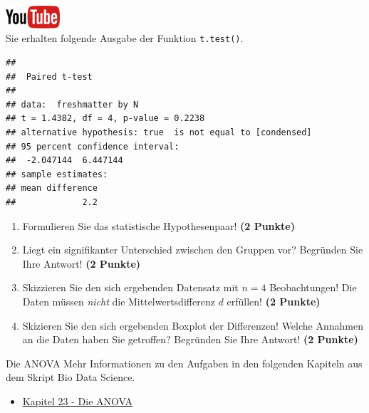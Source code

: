 \documentclass[a4paper, 9pt]{scrartcl}\usepackage[]{graphicx}\usepackage[]{xcolor}
\makeatletter
\newenvironment{kframe}{%
 \def\at@end@of@kframe{}%
 \ifinner\ifhmode%
  \def\at@end@of@kframe{\end{minipage}}%
  \begin{minipage}{\columnwidth}%
 \fi\fi%
 \def\FrameCommand##1{\hskip\@totalleftmargin \hskip-\fboxsep
 \colorbox{shadecolor}{##1}\hskip-\fboxsep
     \hskip-\linewidth \hskip-\@totalleftmargin \hskip\columnwidth}%
 \MakeFramed {\advance\hsize-\width
   \@totalleftmargin\z@ \linewidth\hsize
   \@setminipage}}%
 {\par\unskip\endMakeFramed%
 \at@end@of@kframe}
\newenvironment{knitrout}{}{} %
\makeatother
\begin{document}
\hfill\href{https://youtu.be/kHmfEmU6lrk}{\includegraphics[width =
  2cm]{img/youtube}}\\[1Ex]


Sie erhalten folgende \Rlogo Ausgabe der Funktion \texttt{t.test()}.

\begin{knitrout}
\color{fgcolor}\begin{kframe}
\begin{verbatim}
## 
## 	Paired t-test
## 
## data:  freshmatter by N
## t = 1.4382, df = 4, p-value = 0.2238
## alternative hypothesis: true  is not equal to [condensed]
## 95 percent confidence interval:
##  -2.047144  6.447144
## sample estimates:
## mean difference 
##             2.2
\end{verbatim}
\end{kframe}
\end{knitrout}


\begin{enumerate}
  \item Formulieren Sie das statistische Hypothesenpaar! \textbf{(2
Punkte)}
\item Liegt ein signifikanter Unterschied zwischen den Gruppen vor?
  Begr{\"u}nden Sie Ihre Antwort! \textbf{(2 Punkte)}
\item Skizzieren Sie den sich ergebenden Datensatz mit $n = 4$
  Beobachtungen! Die Daten m{\"u}ssen \textit{nicht} die Mittelwertsdifferenz
  $d$ erf{\"u}llen! \textbf{(2 Punkte)} 
\item Skizieren Sie den sich ergebenden Boxplot der Differenzen! Welche Annahmen an die Daten haben Sie getroffen? Begr{\"u}nden Sie Ihre Antwort! \textbf{(2 Punkte)} 
\end{enumerate}
 
\clearpage
\begin{graybox}{Die ANOVA}
Mehr Informationen zu den Aufgaben in den folgenden Kapiteln aus dem Skript Bio Data Science.
  \begin{itemize}
  \item \href{https://jkruppa.github.io/stat-tests-anova.html}{Kapitel 23 - Die ANOVA}
  \end{itemize}
\end{graybox}
\clearpage
\end{document}
